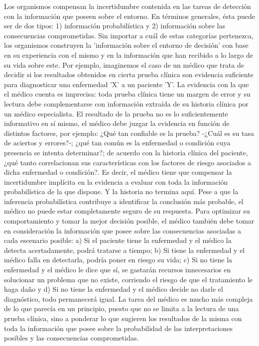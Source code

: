 Los organismos compensan la incertidumbre contenida en las tareas de detección con la información que poseen sobre el entorno. En términos generales, ésta puede ser de dos tipos: 1) información probabilística y 2) información sobre las consecuencias comprometidas. Sin importar a cuál de estas categorías pertenezca, los organismos construyen la 'información sobre el entorno de decisión' con base en su experiencia con el mismo y en la información que han recibido a lo largo de su vida sobre este. Por ejemplo, imaginemos el caso de un médico que trata de decidir si los resultados obtenidos en cierta prueba clínica son evidencia suficiente para diagnosticar una enfermedad 'X' a un paciente 'Y'. La evidencia con la que el médico cuenta es imprecisa: toda prueba clínica tiene un margen de error y su lectura debe complementarse con información extraída de su historia clínica por un médico especialista. El resultado de la prueba no es lo suficientemente informativo en sí mismo, el médico debe juzgar la evidencia en función de distintos factores, por ejemplo: ¿Qué tan confiable es la prueba? -¿Cuál es su tasa de aciertos y errores?-; ¿qué tan común es la enfermedad o condición cuya presencia se intenta determinar?; de acuerdo con la historia clínica del paciente, ¿qué tanto correlacionan sus características con los factores de riesgo asociados a dicha enfermedad o condición?. Es decir, el médico tiene que compensar la incertidumbre implícita en la evidencia a evaluar con toda la información probabilística de la que dispone. Y la historia no termina aquí.  Pese a que la inferencia probabilística contribuye a identificar la conclusión más probable, el médico no puede estar completamente seguro de su respuesta. Para optimizar su comportamiento y tomar la mejor decisión posible, el médico también debe tomar en consideración la información que posee sobre las consecuencias asociadas a cada escenario posible: a) Si el paciente tiene la enfermedad y el médico la detecta acertadamente, podrá tratarse a tiempo; b) Si tiene la enfermedad y el médico falla en detectarla, podría poner en riesgo su vida; c) Si no tiene la enfermedad y el médico le dice que sí, se gastarán recursos innecesarios en solucionar un problema que no existe, corriendo el riesgo de que el tratamiento le haga daño y d) Si no tiene la enfermedad y el médico decide no darle el diagnóstico, todo permanecerá igual. La tarea del médico es mucho más compleja de lo que parecía en un principio, puesto que no se limita a la lectura de una prueba clínica, sino a ponderar lo que sugieren los resultados de la misma con toda la información que posee sobre la probabilidad de las interpretaciones posibles y las consecuencias comprometidas.\\

